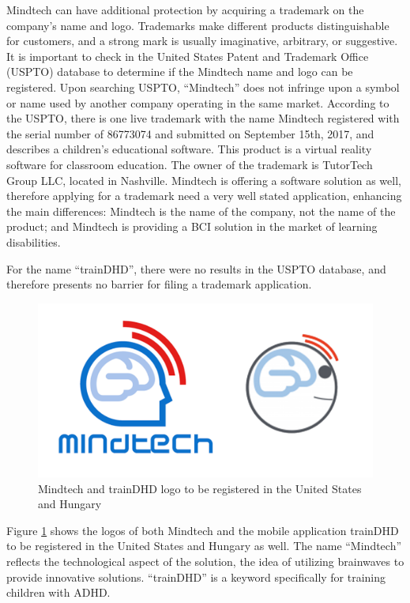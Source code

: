 \documentclass[letterpaper,10pt]{article}
\begin{document}
Mindtech can have additional protection by acquiring a trademark on the company's name and logo.  Trademarks make different products distinguishable for customers, and a strong mark is usually imaginative, arbitrary, or suggestive. It is important to check in the United States Patent and Trademark Office (USPTO) database to determine if the Mindtech name and logo can be registered. Upon searching USPTO, “Mindtech” does not infringe upon a symbol or name used by another company operating in the same market.  
According to the USPTO, there is one live trademark with the name Mindtech registered with the serial number of 86773074 and submitted on September 15th, 2017, and describes a children's educational software. This product is a virtual reality software for classroom education. The owner of the trademark is TutorTech Group LLC, located in Nashville. 
Mindtech is offering a software solution as well, therefore applying for a trademark need a very well stated application, enhancing the main differences: Mindtech is the name of the company, not the name of the product; and Mindtech is providing a BCI solution in the market of learning disabilities. 

For the name “trainDHD”, there were no results in the USPTO database, and therefore presents no barrier for filing a trademark application. \cite{trademark_search}

\begin{figure}[!htb]
\centering
\includegraphics[scale=0.8]{logos.png}
\caption[Mindtech and trainDHD logo]{Mindtech and trainDHD logo to be registered in the United States and Hungary}
\label{img:logo_trademark}
\end{figure}

Figure \ref{img:logo_trademark} shows the logos of both Mindtech and the mobile application trainDHD to be registered in the United States and Hungary as well. The name “Mindtech” reflects the technological aspect of the solution, the idea of utilizing brainwaves to provide innovative solutions. “trainDHD” is a keyword specifically for training children with ADHD.
\end{document}
